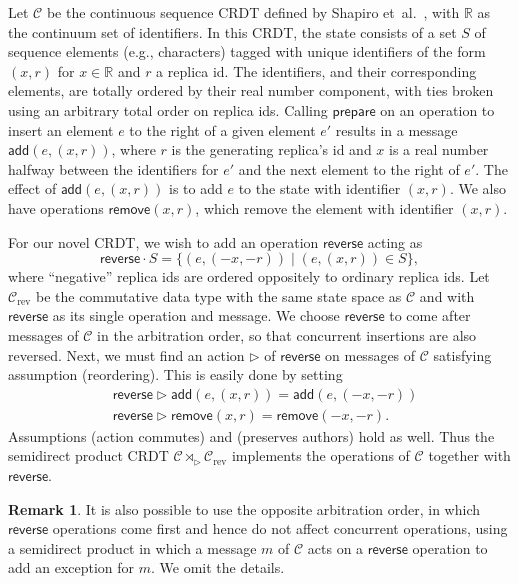 \documentclass[acmsmall,nonacm]{acmart}
\newcommand{\mc}[1]{\ensuremath{\mathcal{#1}}}
\newcommand{\mb}[1]{\ensuremath{\mathbb{#1}}}
\newcommand{\msf}[1]{\ensuremath{\mathsf{#1}}}
\newcommand{\act}{\triangleright}
\newcommand{\R}{\mb{R}}
\theoremstyle{plain}
\theoremstyle{definition}
\newtheorem{myrmk}[mythm]{Remark}
\begin{document}
Let $\mc{C}$ be the continuous sequence CRDT defined by Shapiro et~al.\ \cite[\S 3.5.2]{crdt_survey_2011}, with $\R$ as the continuum set of identifiers.  In this CRDT, the state consists of a set $S$ of sequence elements (e.g., characters) tagged with unique identifiers of the form $(x, r)$ for $x \in \R$ and $r$ a replica id.  The identifiers, and their corresponding elements, are totally ordered by their real number component, with ties broken using an arbitrary total order on replica ids.  Calling $\msf{prepare}$ on an operation to insert an element $e$ to the right of a given element $e'$ results in a message $\msf{add}(e, (x, r))$, where $r$ is the generating replica's id and $x$ is a real number halfway between the identifiers for $e'$ and the next element to the right of $e'$.  The effect of $\msf{add}(e, (x, r))$ is to add $e$ to the state with identifier $(x, r)$.  We also have operations $\msf{remove}(x, r)$, which remove the element with identifier $(x, r)$.

For our novel CRDT, we wish to add an operation $\msf{reverse}$ acting as
\[
\msf{reverse} \cdot S = \{(e, (-x, -r)) \mid (e, (x, r)) \in S\},
\]
where ``negative'' replica ids are ordered oppositely to ordinary replica ids.
Let $\mc{C}_{\text{rev}}$ be the commutative data type with the same state space as $\mc{C}$ and with $\msf{reverse}$ as its single operation and message.  We choose $\msf{reverse}$ to come after messages of $\mc{C}$ in the arbitration order, so that concurrent insertions are also reversed.  Next, we must find an action $\act$ of $\msf{reverse}$ on messages of $\mc{C}$ satisfying assumption (reordering).  This is easily done by setting
\begin{align*}
&\msf{reverse} \act \msf{add}(e, (x, r)) = \msf{add}(e, (-x, -r)) \\
&\msf{reverse} \act \msf{remove}(x, r) = \msf{remove}(-x, -r).
\end{align*}
Assumptions (action commutes) and (preserves authors) hold as well.
Thus the semidirect product CRDT $\mc{C} \rtimes_\act \mc{C}_{\text{rev}}$ implements the operations of $\mc{C}$ together with $\msf{reverse}$.

\begin{myrmk}
It is also possible to use the opposite arbitration order, in which $\msf{reverse}$ operations come first and hence do not affect concurrent operations, using a semidirect product in which a message $m$ of $\mc{C}$ acts on a $\msf{reverse}$ operation to add an exception for $m$.  We omit the details.
\end{myrmk}
\end{document}
